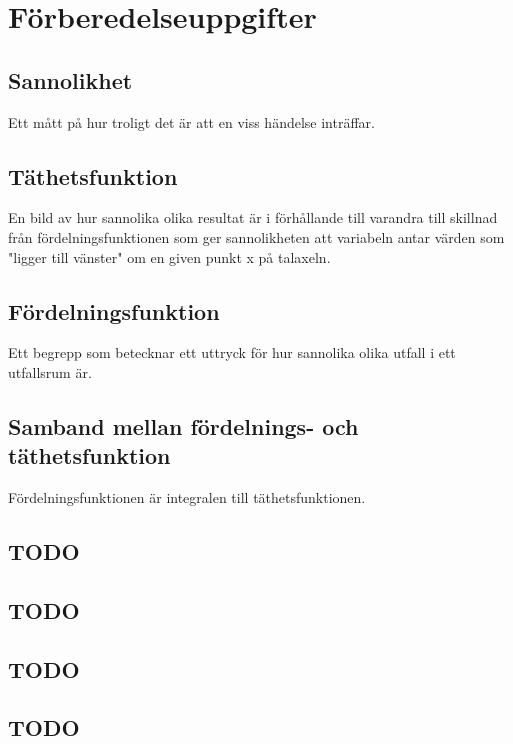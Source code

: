 \documentclass{article}
\begin{document}
\section*{Förberedelseuppgifter}

\addtocounter{section}{1}

\subsection{Sannolikhet}

Ett mått på hur troligt det är att en viss händelse inträffar.

\subsection{Täthetsfunktion}

En bild av hur sannolika olika resultat är i förhållande till varandra till
skillnad från fördelningsfunktionen som ger sannolikheten att variabeln antar
värden som "ligger till vänster" om en given punkt x på talaxeln.

\subsection{Fördelningsfunktion}

Ett begrepp som betecknar ett uttryck för hur sannolika olika utfall i ett
utfallsrum är.

\subsection{Samband mellan fördelnings- och täthetsfunktion}

Fördelningsfunktionen är integralen till täthetsfunktionen.

\addtocounter{section}{1}

\subsection{TODO}
\subsection{TODO}
\subsection{TODO}
\subsection{TODO}
\end{document}
